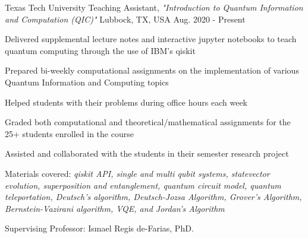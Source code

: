 \begin{cventries}
    \cventry
    {Texas Tech University}
    {Teaching Assistant, \textit{"Introduction to Quantum Information and Computation (QIC)"}}
    {Lubbock, TX, USA}
    {Aug. 2020 - Present}
    {
        \begin{cvitems}
        \item{Delivered supplemental lecture notes and interactive jupyter notebooks to teach quantum computing through the use of IBM's qiskit}
        \item{Prepared bi-weekly computational assignments on the implementation of various Quantum Information and Computing topics}
        \item{Helped students with their problems during office hours each week}
        \item{Graded both computational and theoretical/mathematical assignments for the 25+ students enrolled in the course}
        \item{Assisted and collaborated with the students in their semester research project}
        \item{Materials covered: \textit{qiskit API, single and multi qubit systems, statevector evolution, superposition and entanglement, quantum circuit model, quantum teleportation, Deutsch's algorithm, Deutsch-Jozsa Algorithm, Grover's Algorithm, Bernstein-Vazirani algorithm, VQE, and Jordan's Algorithm}}
        \item{Supervising Professor: Ismael Regis de-Farias, PhD.}
        \end{cvitems}
        \vspace{1em}
    }


\end{cventries}
